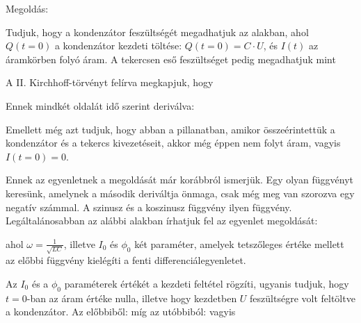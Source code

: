 
\ifdefined\megoldas

 Megoldás:

 Tudjuk, hogy a kondenzátor feszültségét megadhatjuk az 
 alakban, ahol $Q(t=0)$ a kondenzátor kezdeti töltése: $Q(t=0)=C\cdot U$, és $I(t)$ az áramkörben folyó áram. A tekercsen eső feszültséget pedig megadhatjuk mint 

 A II. Kirchhoff-törvényt felírva megkapjuk, hogy

 
 Ennek mindkét oldalát idő szerint deriválva:

 Emellett még azt tudjuk, hogy abban a pillanatban, amikor összeérintettük a kondenzátor és a tekercs kivezetéseit, akkor még éppen nem folyt áram, vagyis $I(t=0)=0$.

 Ennek az egyenletnek a megoldását már korábbról ismerjük. Egy olyan függvényt keresünk, amelynek a második deriváltja önmaga, csak még meg van szorozva egy negatív számmal. A szinusz és a koszinusz függvény ilyen függvény. Legáltalánosabban az alábbi alakban írhatjuk fel az egyenlet megoldását:

 ahol $\omega=\frac{1}{\sqrt{LC}}$, illetve $I_0$ és $\phi_0$ két paraméter, amelyek tetszőleges értéke mellett az előbbi függvény kielégíti a fenti differenciálegyenletet.

 Az $I_0$ és a $\phi_0$ paraméterek értékét a kezdeti feltétel rögzíti, ugyanis tudjuk, hogy $t=0$-ban az áram értéke nulla, illetve hogy kezdetben $U$ feszültségre volt feltöltve a kondenzátor. Az előbbiből:
 míg az utóbbiból:
 vagyis

